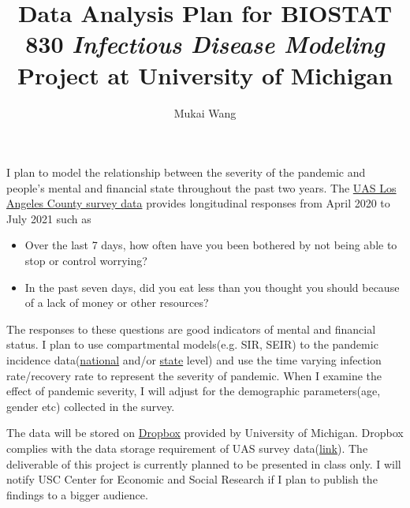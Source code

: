 \documentclass[12pt]{article}
\title{Data Analysis Plan for BIOSTAT 830 \emph{Infectious Disease Modeling} Project at University of Michigan }
\date{}
\author{Mukai Wang}
\begin{document}
\maketitle

I plan to model the relationship between the severity of the pandemic and people's mental and financial state throughout the past two years. The \href{https://uasdata.usc.edu/index.php}{UAS Los Angeles County survey data} provides longitudinal responses from April 2020 to July 2021 such as 
\begin{itemize}
\item Over the last 7 days, how often have you been bothered by not being able to stop or control worrying?
\item In the past seven days, did you eat less than you thought you should because of a lack of money or other
resources?
\end{itemize}
The responses to these questions are good indicators of mental and financial status. I plan to use compartmental models(e.g. SIR, SEIR) to the pandemic incidence data(\href{https://data.cdc.gov/browse?q=COVID-19&sortBy=relevance}{national} and/or \href{https://data.ca.gov/group/covid-19}{state} level) and use the time varying infection rate/recovery rate to represent the severity of pandemic. When I examine the effect of pandemic severity, I will adjust for the demographic parameters(age, gender etc) collected in the survey.

The data will be stored on \href{https://its.umich.edu/communication/collaboration/dropbox}{Dropbox} provided by University of Michigan. Dropbox complies with the data storage requirement of UAS survey data(\href{https://safecomputing.umich.edu/dataguide/?q=node/251}{link}). The deliverable of this project is currently planned to be presented in class only. I will notify USC Center for Economic and Social Research if I plan to publish the findings to a bigger audience.
\end{document}
